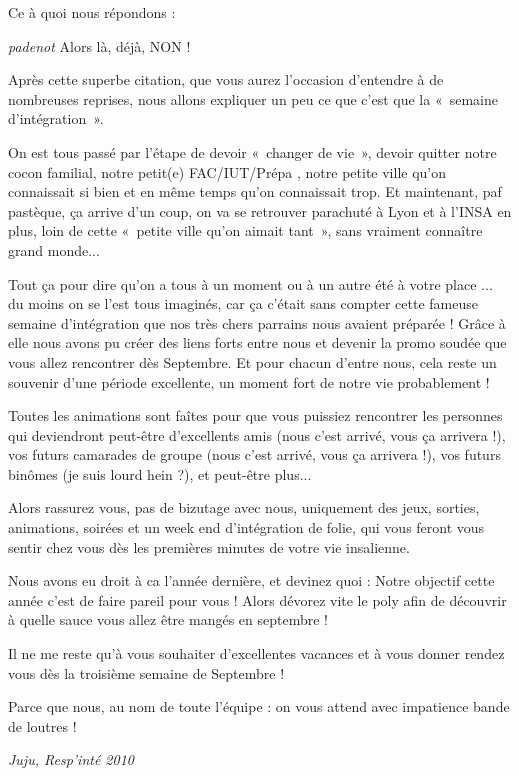 Ce à quoi nous répondons :

\begin{citationi}{ \emph{padenot} }
    Alors là, déjà, NON ! 
\end{citationi}

Après cette superbe citation, que vous aurez l'occasion d'entendre à de
nombreuses reprises, nous allons expliquer un peu ce que c'est que la «~semaine
d'intégration~».

On est tous passé par l'étape de devoir «~changer de vie~», devoir quitter notre
cocon familial, notre petit(e) FAC/IUT/Prépa , notre petite ville qu'on
connaissait si bien et en même temps qu'on connaissait trop.
Et maintenant, paf pastèque, ça arrive d'un coup, on va se retrouver parachuté
à Lyon et à l'INSA en plus, loin de cette «~petite ville qu'on aimait tant~»,
sans vraiment connaître grand monde...

Tout ça pour dire qu'on a tous à un moment ou à un autre été à votre place ...
du moins on se l'est tous imaginés, car ça c'était sans compter cette fameuse
semaine d'intégration que nos très chers parrains nous avaient préparée ! Grâce
à elle nous avons pu créer des liens forts entre nous et devenir la promo
soudée que vous allez rencontrer dès Septembre. Et pour chacun d'entre nous,
cela reste un souvenir d'une période excellente, un moment fort de notre
vie probablement !

Toutes les animations sont faîtes pour que vous puissiez rencontrer les
personnes qui deviendront peut-être d'excellents amis (nous c'est arrivé,
vous ça arrivera !), vos futurs camarades de groupe (nous c'est
arrivé, vous ça arrivera !), vos futurs binômes (je suis lourd
hein ?), et peut-être plus...

Alors rassurez vous, pas de bizutage avec nous, uniquement des jeux,
sorties, animations, soirées et un week end d'intégration de folie, qui
vous feront vous sentir chez vous dès les premières minutes de votre vie
insalienne.

Nous avons eu droit à ca l'année dernière, et devinez quoi : Notre objectif
cette année c'est de faire pareil pour vous ! Alors dévorez vite le poly afin
de découvrir à quelle sauce vous allez être mangés en septembre !

Il ne me reste qu'à vous souhaiter d'excellentes vacances et à vous donner
rendez vous dès la troisième semaine de Septembre !

Parce que nous, au nom de toute l'équipe : on vous attend avec impatience bande
de loutres !
\vspace{1cm}
\begin{flushright}
\emph{Juju, Resp'inté 2010}
\end{flushright}
\newpage
